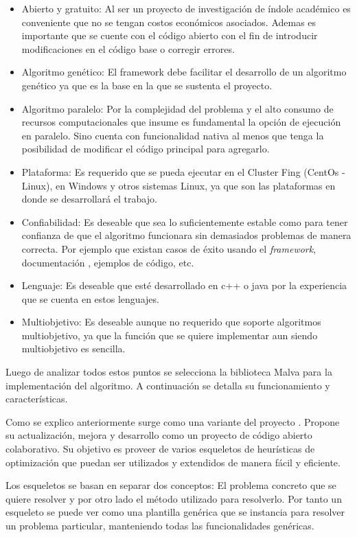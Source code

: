 \begin{itemize}
	\item Abierto y gratuito: Al ser un proyecto de investigación de índole académico es conveniente que no se tengan costos económicos asociados. Ademas es importante que se cuente con el código abierto con el fin de introducir modificaciones en el código base o corregir errores.
	\item Algoritmo genético: El framework debe facilitar el desarrollo de un algoritmo genético ya que es la base en la que se sustenta el proyecto.
	\item Algoritmo paralelo: Por la complejidad del problema y el alto consumo de recursos computacionales que insume es fundamental la opción de ejecución en paralelo. Sino cuenta con funcionalidad nativa al menos que tenga la posibilidad de modificar el código principal para agregarlo.
	\item Plataforma: Es requerido que se pueda ejecutar en el Cluster Fing (CentOs - Linux), en Windows y otros sistemas Linux, ya que son las plataformas en donde se desarrollará el trabajo.
	\item Confiabilidad: Es deseable que sea lo suficientemente estable como para tener confianza de que el algoritmo funcionara sin demasiados problemas de manera correcta. Por ejemplo que existan casos de éxito usando el \emph{framework}, documentación , ejemplos de código, etc.
	\item Lenguaje: Es deseable que esté desarrollado en c++ o java por la experiencia que se cuenta en estos lenguajes. 
	\item Multiobjetivo: Es deseable aunque no requerido que soporte algoritmos multiobjetivo, ya que la función que se quiere implementar aun siendo multiobjetivo es sencilla.	
\end{itemize} 

Luego de analizar todos estos puntos se selecciona la biblioteca Malva para la implementación del algoritmo. A continuación se detalla su funcionamiento y características.


Como se explico anteriormente \citet{Malva} surge como una variante del proyecto \citet{Mallba}. Propone su actualización, mejora y desarrollo como un proyecto de código abierto colaborativo.  Su objetivo es proveer de varios esqueletos de  heurísticas de optimización que puedan ser utilizados y extendidos de manera fácil y eficiente.

Los esqueletos se basan en separar dos conceptos: El problema concreto que se quiere resolver y por otro lado el método utilizado para resolverlo. Por tanto un esqueleto se puede ver como una plantilla genérica que se instancia para resolver un problema particular, manteniendo todas las funcionalidades genéricas.

